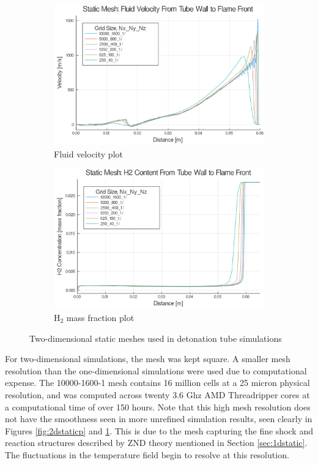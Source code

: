 \begin{figure} \ContinuedFloat
    
    \begin{subfigure}[]{0.95\textwidth}
        \centering
        \includegraphics[width=\textwidth]{./figs/staticfigs/u.png}
        \caption{Fluid velocity plot}
        \label{fig:2dstaticu}
    \end{subfigure}

    \begin{subfigure}[]{0.95\textwidth}
        \centering
        \includegraphics[width=\textwidth]{./figs/staticfigs/y.png}
        \caption{H\(_2\) mass fraction plot}
    \end{subfigure}

    \caption{Two-dimensional static meshes used in detonation tube simulations}
    \label{fig:2dstatic}
\end{figure}%
For two-dimensional simulations, the mesh was kept square. A smaller mesh resolution than the one-dimensional simulations were used due to computational expense. The 10000-1600-1 mesh contains 16 million cells at a 25 micron physical resolution, and was computed across twenty 3.6 Ghz AMD Threadripper cores at a computational time of over 150 hours. Note that this high mesh resolution does not have the smoothness seen in more unrefined simulation results, seen clearly in Figures \ref{fig:2dstaticp} and \ref{fig:2dstaticu}. This is due to the mesh capturing the fine shock and reaction structures described by ZND theory mentioned in Section \ref{sec:1dstatic}. The fluctuations in the temperature field begin to resolve at this resolution. 

